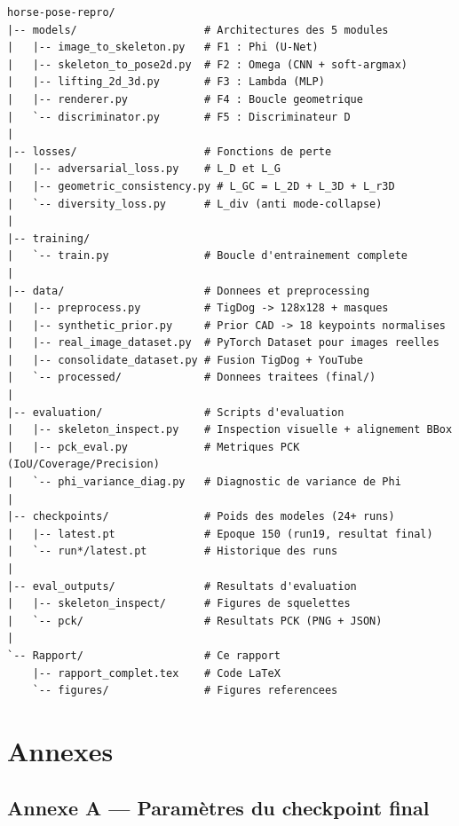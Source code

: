 \documentclass[12pt,a4paper]{article}
\begin{document}
\begin{verbatim}
horse-pose-repro/
|-- models/                    # Architectures des 5 modules
|   |-- image_to_skeleton.py   # F1 : Phi (U-Net)
|   |-- skeleton_to_pose2d.py  # F2 : Omega (CNN + soft-argmax)
|   |-- lifting_2d_3d.py       # F3 : Lambda (MLP)
|   |-- renderer.py            # F4 : Boucle geometrique
|   `-- discriminator.py       # F5 : Discriminateur D
|
|-- losses/                    # Fonctions de perte
|   |-- adversarial_loss.py    # L_D et L_G
|   |-- geometric_consistency.py # L_GC = L_2D + L_3D + L_r3D
|   `-- diversity_loss.py      # L_div (anti mode-collapse)
|
|-- training/
|   `-- train.py               # Boucle d'entrainement complete
|
|-- data/                      # Donnees et preprocessing
|   |-- preprocess.py          # TigDog -> 128x128 + masques
|   |-- synthetic_prior.py     # Prior CAD -> 18 keypoints normalises
|   |-- real_image_dataset.py  # PyTorch Dataset pour images reelles
|   |-- consolidate_dataset.py # Fusion TigDog + YouTube
|   `-- processed/             # Donnees traitees (final/)
|
|-- evaluation/                # Scripts d'evaluation
|   |-- skeleton_inspect.py    # Inspection visuelle + alignement BBox
|   |-- pck_eval.py            # Metriques PCK (IoU/Coverage/Precision)
|   `-- phi_variance_diag.py   # Diagnostic de variance de Phi
|
|-- checkpoints/               # Poids des modeles (24+ runs)
|   |-- latest.pt              # Epoque 150 (run19, resultat final)
|   `-- run*/latest.pt         # Historique des runs
|
|-- eval_outputs/              # Resultats d'evaluation
|   |-- skeleton_inspect/      # Figures de squelettes
|   `-- pck/                   # Resultats PCK (PNG + JSON)
|
`-- Rapport/                   # Ce rapport
    |-- rapport_complet.tex    # Code LaTeX
    `-- figures/               # Figures referencees
\end{verbatim}

\section*{Annexes}

\subsection*{Annexe A --- Paramètres du checkpoint final}
\end{document}
